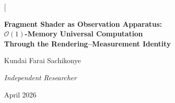 \documentclass[11pt,twocolumn,a4paper]{article}
\newcommand{\BigO}{\mathcal{O}}
\begin{document}
\twocolumn[
\begin{@twocolumnfalse}
\begin{center}

{\LARGE\bfseries Fragment Shader as Observation Apparatus:\\[4pt]
$\BigO(1)$-Memory Universal Computation\\[4pt]
Through the Rendering--Measurement Identity}

\vspace{12pt}

{\large Kundai Farai Sachikonye}

\vspace{6pt}

{\small\itshape Independent Researcher}

\vspace{6pt}

{\small April 2026}

\vspace{14pt}


\end{center}
\end{@twocolumnfalse}
\end{document}
